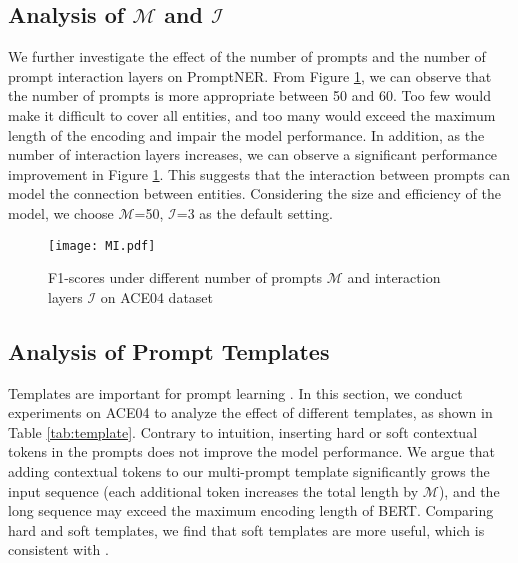 \documentclass[11pt]{article}
\begin{document}
\subsection{Analysis of $\mathcal{M}$ and $\mathcal{I}$}


We further investigate the effect of the number of prompts and the number of prompt interaction layers on PromptNER.
From Figure \ref{fig:mi}, we can observe that the number of prompts is more appropriate between 50 and 60. Too few would make it difficult to cover all entities, and too many would exceed the maximum length of the encoding and impair the model performance.
In addition, as the number of interaction layers increases, we can observe a significant performance improvement in Figure \ref{fig:mi}.
This suggests that the interaction between prompts can model the connection between entities.
Considering the size and efficiency of the model, we choose $\mathcal{M}$=50, $\mathcal{I}$=3 as the default setting.

\begin{figure}[!h]
    \centering
    \texttt{[image: MI.pdf]}
    \caption{F1-scores under different number of prompts $\mathcal{M}$ and interaction layers $\mathcal{I}$ on ACE04 dataset}
    \label{fig:mi}
\end{figure}

\subsection{Analysis of Prompt Templates}
\label{template}
Templates are important for prompt learning \citep{gao-etal-2021-making, ding-etal-2021-nerd}. In this section, we conduct experiments on ACE04 to analyze the effect of different templates, as shown in Table \ref{tab:template}. Contrary to intuition, inserting hard or soft contextual tokens in the prompts does not improve the model performance. We argue that adding contextual tokens to our multi-prompt template significantly grows the input sequence (each additional token increases the total length by $\mathcal{M}$), and the long sequence may exceed the maximum encoding length of BERT. Comparing hard and soft templates, we find that soft templates are more useful, which is consistent with \citet{ding-etal-2021-nerd}.
\end{document}
